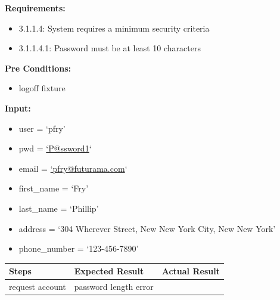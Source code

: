 \documentclass[letterpaper,10pt,english]{sphinxmanual}
\begin{document}
\begin{fulllineitems}
\label{STD/test_password:test_password.test_password_length}
\textbf{Requirements:}
\begin{itemize}
\item {} 
3.1.1.4: System requires a minimum security criteria

\item {} 
3.1.1.4.1: Password must be at least 10 characters

\end{itemize}

\textbf{Pre Conditions:}
\begin{itemize}
\item {} 
logoff fixture

\end{itemize}

\textbf{Input:}
\begin{itemize}
\item {} 
user = `pfry'

\item {} 
pwd = \href{mailto:'P@ssword1}{`P@ssword1}`

\item {} 
email = \href{mailto:'pfry@futurama.com}{`pfry@futurama.com}`

\item {} 
first\_name = `Fry'

\item {} 
last\_name = `Phillip'

\item {} 
address = `304 Wherever Street, New New York City, New New York'

\item {} 
phone\_number = `123-456-7890'

\end{itemize}

\begin{tabulary}{\linewidth}{|L|L|L|}
\hline
\textsf{\relax 
Steps
} & \textsf{\relax 
Expected Result
} & \textsf{\relax 
Actual Result
}\\
\hline
request account
 & 
password length error
 & \\
\hline\end{tabulary}


\end{fulllineitems}

\end{document}
